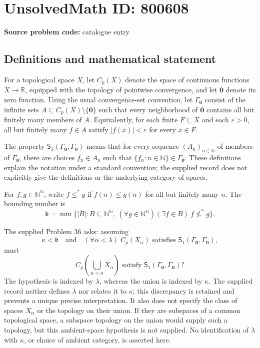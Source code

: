 \documentclass[11pt]{article}
\newcommand{\N}{\mathbb{N}}
\newcommand{\R}{\mathbb{R}}
\begin{document}
\section*{UnsolvedMath ID: 800608}
\textbf{Source problem code:} catalogue entry
\subsection{Definitions and mathematical statement}
For a topological space \(X\), let \(C_p(X)\) denote the space of continuous functions \(X\to\R\), equipped with the topology of pointwise convergence, and let \(\mathbf{0}\) denote its zero function. Using the usual convergence-set convention, let \(\Gamma_{\mathbf{0}}\) consist of the infinite sets \(A\subseteq C_p(X)\setminus\{\mathbf{0}\}\) such that every neighborhood of \(\mathbf{0}\) contains all but finitely many members of \(A\). Equivalently, for each finite \(F\subseteq X\) and each \(\varepsilon>0\), all but finitely many \(f\in A\) satisfy \(|f(x)|<\varepsilon\) for every \(x\in F\).

The property \(\mathsf{S}_1(\Gamma_{\mathbf{0}},\Gamma_{\mathbf{0}})\) means that for every sequence \((A_n)_{n\in\N}\) of members of \(\Gamma_{\mathbf{0}}\), there are choices \(f_n\in A_n\) such that \(\{f_n:n\in\N\}\in\Gamma_{\mathbf{0}}\). These definitions explain the notation under a standard convention; the supplied record does not explicitly give the definitions or the underlying category of spaces.

For \(f,g\in\N^{\N}\), write \(f\leq^*g\) if \(f(n)\leq g(n)\) for all but finitely many \(n\). The bounding number is
\[
\mathfrak b=\min\bigl\{|B|:B\subseteq\N^{\N},\ (\forall g\in\N^{\N})(\exists f\in B)\ f\not\leq^*g\bigr\}.
\]

The supplied Problem 36 asks: assuming
\[
\kappa<\mathfrak b
\quad\text{and}\quad
(\forall\alpha<\lambda)\;
C_p(X_\alpha)\text{ satisfies }\mathsf{S}_1(\Gamma_{\mathbf{0}},\Gamma_{\mathbf{0}}),
\]
must
\[
C_p\!\left(\bigcup_{\alpha<\kappa}X_\alpha\right)
\text{ satisfy }\mathsf{S}_1(\Gamma_{\mathbf{0}},\Gamma_{\mathbf{0}})?
\]
The hypothesis is indexed by \(\lambda\), whereas the union is indexed by \(\kappa\). The supplied record neither defines \(\lambda\) nor relates it to \(\kappa\); this discrepancy is retained and prevents a unique precise interpretation. It also does not specify the class of spaces \(X_\alpha\) or the topology on their union. If they are subspaces of a common topological space, a subspace topology on the union would supply such a topology, but this ambient-space hypothesis is not supplied. No identification of \(\lambda\) with \(\kappa\), or choice of ambient category, is asserted here.
\end{document}
